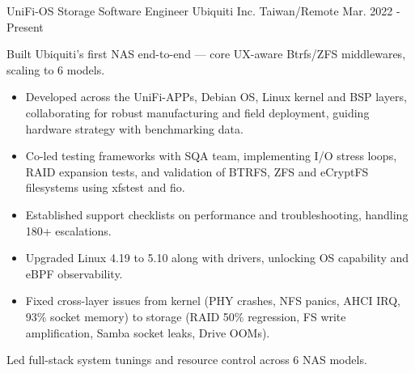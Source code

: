 

\begin{cventries}

  \cventry
    {UniFi-OS Storage Software Engineer} %
    {Ubiquiti Inc.} %
    {Taiwan/Remote} %
    {Mar. 2022 - Present} %
    {
      \begin{cvitems} %
        \item {
            Built Ubiquiti's first NAS end-to-end --- core UX-aware Btrfs/ZFS middlewares, scaling to 6 models.
          }
          \begin{itemize}
          \item {
            Developed across the UniFi-APPs, Debian OS, Linux kernel and BSP
            layers, collaborating for robust manufacturing and field
            deployment, guiding hardware strategy with benchmarking data.
          }
          \item {
            Co-led testing frameworks with SQA team, implementing I/O stress
            loops, RAID expansion tests, and validation of BTRFS, ZFS and
            eCryptFS filesystems using xfstest and fio.
          }
          \item {
            Established support checklists on performance and troubleshooting, handling 180+
            escalations.
          }
          \item {
            Upgraded Linux 4.19 to 5.10 along with drivers, unlocking
            OS capability and eBPF observability.
          }
          \item {
            Fixed cross-layer issues from kernel (PHY crashes, NFS panics, AHCI IRQ, 93\% socket memory)
            to storage (RAID 50\% regression, FS write amplification, Samba socket leaks, Drive OOMs).
          }
          \end{itemize}
        \item {
          Led full-stack system tunings and resource control across 6 NAS
          models.
          }
          \begin{itemize}

\end{itemize}
\end{cvitems}}
\end{cventries}
